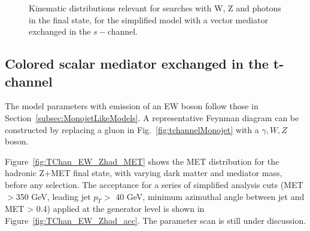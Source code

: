\begin{figure}[h!]
{	}    
	\hfill
	\caption{Kinematic distributions relevant for searches with W, Z and photons in the final state, 
		for the simplified model with a vector mediator exchanged in the $s-$channel.}
	\label{fig:DMV_EW_kinematics}
\end{figure}

\subsection{Colored scalar mediator exchanged in the t-channel}

The model parameters with emission of an EW boson follow those in Section~\ref{subsec:MonojetLikeModels}.   A representative Feynman diagram can be
constructed by replacing a gluon in Fig.~\ref{fig:tchannelMonojet}
with a $\gamma,W,Z$ boson.

Figure~\ref{fig:TChan_EW_Zhad_MET} shows the MET distribution for the hadronic Z+MET final state, 
with varying dark matter and mediator mass, before any selection. 
The acceptance for a series of simplified analysis cuts 
(MET$>$350 GeV, leading jet $p_T >$ 40 GeV, minimum azimuthal angle between jet and MET > 0.4) 
applied at the generator level is shown in Figure~\ref{fig:TChan_EW_Zhad_acc}. 
The parameter scan is still under discussion. 

